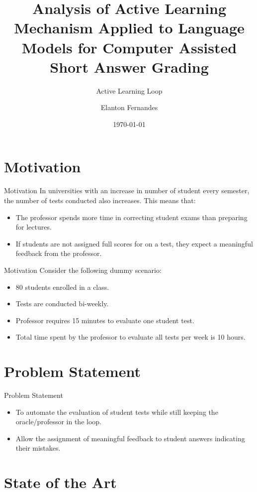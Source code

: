 \documentclass[aspectratio=169]{beamer}
\author[Name]{Elanton Fernandes}
\subtitle{Active Learning Loop}
\title{Analysis of Active Learning Mechanism Applied to Language Models for Computer Assisted Short Answer Grading}
\institute[HBRS]{Hochschule Bonn-Rhein-Sieg}
\date{\today}
\begin{document}
{
\begin{frame}
\titlepage
\end{frame}
}


\section{Motivation}
\begin{frame}{Motivation}
	In universities with an increase in number of student every semester, the number of tests conducted also increases. This means that:
	\begin{itemize}
		\item The professor spends more time in correcting student exams than preparing for lectures.
		\item If students are not assigned full scores for on a test, they expect a meaningful feedback from the professor.
	\end{itemize}
\end{frame}
\begin{frame}{Motivation}
	Consider the following dummy scenario:
	\begin{itemize}
		\item 80 students enrolled in a class.
		\item Tests are conducted bi-weekly.
		\item Professor requires 15 minutes to evaluate one student test.
		\item Total time spent by the professor to evaluate all tests per week is 10 hours. 
	\end{itemize}
\end{frame}
\section{Problem Statement}
\begin{frame}{Problem Statement}
	\begin{itemize}
		\item To automate the evaluation of student tests while still keeping the oracle/professor in the loop.
		\item Allow the assignment of meaningful feedback to student answers indicating their mistakes.
	\end{itemize}
	
\end{frame}

\section{State of the Art}
\end{document}
